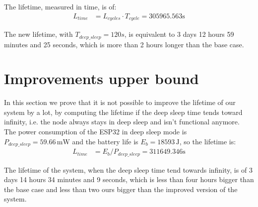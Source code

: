 The lifetime, measured in time, is of:
\begin{align*}
	L_{time}&= L_{cycles} \cdot T_{cycle} = 305965.563 \text{s}
\end{align*}

The new lifetime, with $T_{deep\_sleep} = 120 s$, is equivalent to 3 days 12 hours 59 minutes and 25 seconds, which is more than 2 hours longer than the base case.

\section{Improvements upper bound}
In this section we prove that it is not possible to improve the lifetime of our system by a lot, by computing the lifetime if the deep sleep time tends toward infinity, i.e. the node always stays in deep sleep and isn't functional anymore.\\
The power consumption of the ESP32 in deep sleep mode is $P_{deep\_sleep} = 59.66\,\text{mW}$ and the battery life is $E_{b} = 18593\,\text{J}$, so the lifetime is:
\begin{align*}
	L_{time}&= E_{b} / P_{deep\_sleep} = 311649.346 \text{s}
\end{align*}

The lifetime of the system, when the deep sleep time tend towards infinity, is of 3 days 14 hours 34 minutes and 9 seconds, which is less than four hours bigger than the base case and less than two ours bigger than the improved version of the system.









